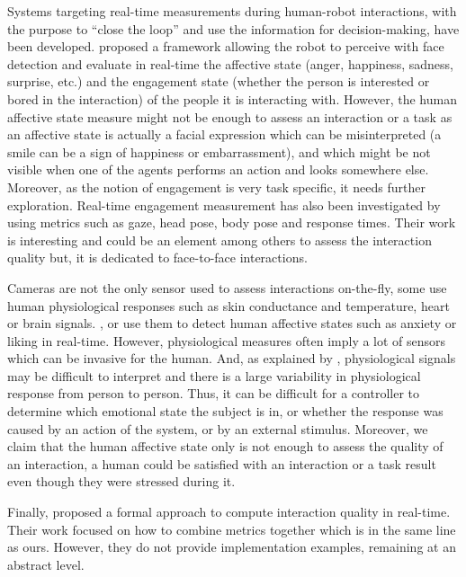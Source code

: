 \documentclass[a4paper,11pt,twoside]{StyleThese}
\begin{document}
Systems targeting real-time measurements during human-robot interactions, with the purpose to ``close the loop'' and use the information for decision-making, have been developed. \cite{tanevska:hal-01615491} proposed a framework allowing the robot to perceive with face detection and evaluate in real-time the affective state (\ie anger, happiness, sadness, surprise, etc.) and the engagement state (\ie whether the person is interested or bored in the interaction) of the people it is interacting with. However, the human affective state measure might not be enough to assess an interaction or a task as an affective state is actually a facial expression which can be misinterpreted (\eg a smile can be a sign of happiness or embarrassment), and which might be not visible when one of the agents performs an action and looks somewhere else. Moreover, as the notion of engagement is very task specific, it needs further exploration. Real-time engagement measurement has also been investigated by \cite{anzalone_2015_evaluating} using metrics such as gaze, head pose, body pose and response times. Their work is interesting and could be an element among others to assess the interaction quality but, it is dedicated to face-to-face interactions. 

Cameras are not the only sensor used to assess interactions on-the-fly, some use human physiological responses such as skin conductance and temperature, heart or brain signals. \cite{itoh2006}, \cite{bekele_2014} or \cite{kulic2007} use them to detect human affective states such as anxiety or liking in real-time. However, physiological measures often imply a lot of sensors which can be invasive for the human. And, as explained by \cite{kulic_2003_estimating}, physiological signals may be difficult to interpret and there is a large variability in physiological response from person to person. Thus, it can be difficult for a controller to determine which emotional state the subject is in, or whether the response was caused by an action of the system, or by an external stimulus. Moreover, we claim that the human affective state only is not enough to assess the quality of an interaction, a human could be satisfied with an interaction or a task result even though they were stressed during it.


Finally, \cite{bensch17} proposed a formal approach to compute interaction quality in real-time. Their work focused on how to combine metrics together which is in the same line as ours. However, they do not provide implementation examples, remaining at an abstract level.
\end{document}
